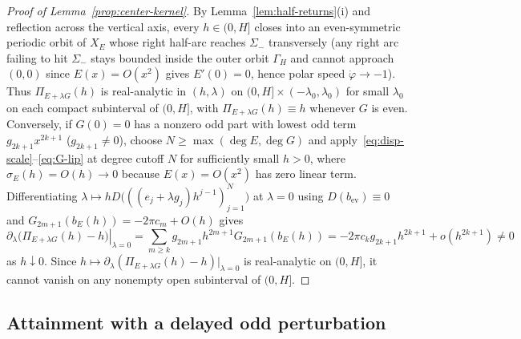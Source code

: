 \begin{proof}[Proof of Lemma~\ref{prop:center-kernel}]
By Lemma~\ref{lem:half-returns}(i) and reflection across the vertical axis, every $h\in(0,H]$ closes into an even-symmetric periodic orbit of $X_E$ whose right half-arc reaches $\Sigma_-$ transversely (any right arc failing to hit $\Sigma_-$ stays bounded inside the outer orbit $\Gamma_H$ and cannot approach $(0,0)$ since $E(x)=O(x^2)$ gives $E'(0)=0$, hence polar speed $\dot\varphi\to -1$). Thus $\Pi_{E+\lambda G}(h)$ is real-analytic in $(h,\lambda)$ on $(0,H]\times(-\lambda_0,\lambda_0)$ for small $\lambda_0$ on each compact subinterval of $(0,H]$, with $\Pi_{E+\lambda G}(h)\equiv h$ whenever $G$ is even. Conversely, if $G(0)=0$ has a nonzero odd part with lowest odd term $g_{2k+1}x^{2k+1}$ ($g_{2k+1}\neq 0$), choose $N\ge\max(\deg E,\deg G)$ and apply~\eqref{eq:disp-scale}--\eqref{eq:G-lip} at degree cutoff $N$ for sufficiently small $h>0$, where $\sigma_E(h)=O(h)\to 0$ because $E(x)=O(x^2)$ has zero linear term. Differentiating $\lambda\mapsto h D\big(((e_j+\lambda g_j)h^{j-1})_{j=1}^N\big)$ at $\lambda=0$ using $D(b_{\mathrm{ev}})\equiv 0$ and $G_{2m+1}(b_E(h))=-2\pi c_m+O(h)$ gives
\[
  \left.\partial_\lambda\big(\Pi_{E+\lambda G}(h)-h\big)\right|_{\lambda=0} = \sum_{m\ge k} g_{2m+1} h^{2m+1} G_{2m+1}(b_E(h)) = -2\pi c_k g_{2k+1} h^{2k+1} + o\!\left(h^{2k+1}\right) \neq 0
\]
as $h\downarrow 0$. Since $h\mapsto\partial_\lambda(\Pi_{E+\lambda G}(h)-h)|_{\lambda=0}$ is real-analytic on $(0,H]$, it cannot vanish on any nonempty open subinterval of $(0,H]$.
\end{proof}

\subsection{Attainment with a delayed odd perturbation}\label{subsec:weak-sharp}

